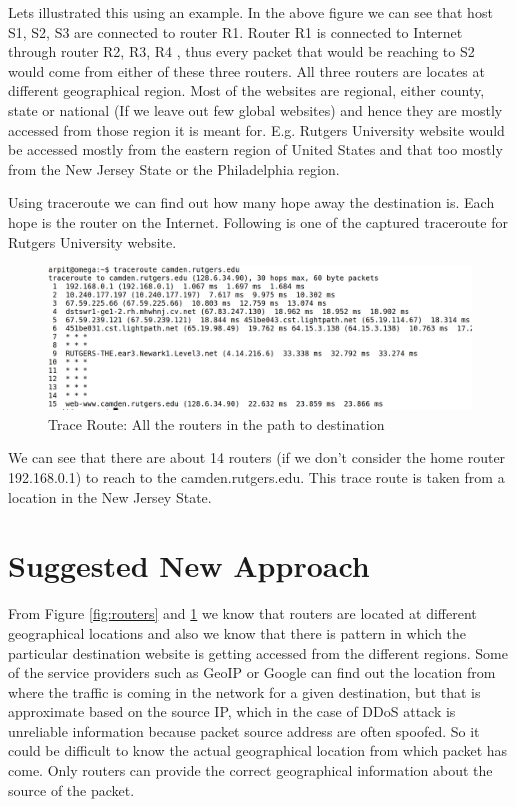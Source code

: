 \documentclass[10pt,oneside,a4paper]{article}
\begin{document}
Lets illustrated this using an example. In the above figure we can see that host S1, S2, S3 are connected to router R1. Router R1 is connected to Internet through router R2, R3, R4 , thus every packet that would be reaching to S2 would come from either of these three routers. All three routers are locates at different geographical region. Most of the websites are regional, either county, state or national (If we leave out few global websites) and hence they are mostly accessed from those region it is meant for. E.g. Rutgers University website would be accessed mostly from the eastern region of United States and that too mostly from the New Jersey State or the Philadelphia region.\par
Using traceroute we can find out how many hope away the destination is. Each hope is the router on the Internet. Following is one of the captured traceroute for Rutgers University website.\par
\begin{figure}[H]
\centering
\includegraphics[width=\textwidth]{TraceRoute}
\caption{Trace Route: All the routers in the path to destination} \label{fig:traceroute}
\end{figure}

We can see that there are about 14 routers (if we don't consider the home router 192.168.0.1) to reach to the camden.rutgers.edu. This trace route is taken from a location in the New Jersey State.\par


\section{Suggested New Approach}
From Figure \ref{fig:routers} and \ref{fig:traceroute} we know that routers are located at different geographical locations and also we know that there is pattern in which the particular destination website is getting accessed from the different regions. Some of the service providers such as  GeoIP or Google can find out the location from where the traffic is coming in the network for a given destination, but that is approximate based on the source IP, which in the case of DDoS attack is unreliable information because packet source address are often spoofed. So it could be difficult to know the actual geographical location from which packet has come. Only routers can provide the correct geographical information about the source of the packet.\par
\end{document}
